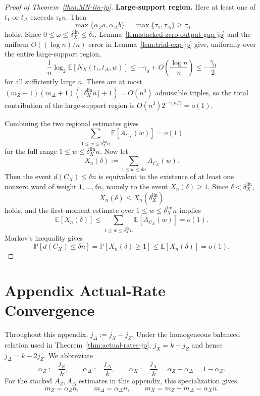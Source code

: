 \documentclass[11pt]{article}
\theoremstyle{definition}
\newcommand{\engappendixsection}[2]{%
  \refstepcounter{section}%
  \section*{Appendix \thesection\quad #1}%
  \label{#2}%
}
\newcommand{\EE}{\mathbb E}
\newcommand{\PP}{\mathbb P}
\newcommand{\CX}{C_X}
\newcommand{\NX}{N_X}
\begin{document}
\begin{proof}[Proof of Theorem~\ref{thm:MN-lin-jp}]
\smallskip
\noindent\textbf{Large-support region.}
Here at least one of \(t_1\) or \(t_\Delta\) exceeds \(\tau_0 n\).
Then
\begin{equation*}
\max\{\alpha_Za,\alpha_\Delta b\}
=\max\{\tau_1,\tau_\Delta\}
\ge \tau_0
\end{equation*}
holds.
Since \(0\le\omega\le\delta_X^{\mathrm{lin}}\le\delta_*\), Lemma~\ref{lem:stacked-zero-output-gap-jp} and the uniform \(O((\log n)/n)\) error in Lemma~\ref{lem:trial-exp-jp} give, uniformly over the entire large-support region,
\begin{equation*}
\frac1n\log_2\EE[\NX(t_1,t_\Delta,w)]
\le -\gamma_0+O\!\left(\frac{\log n}{n}\right)
\le -\frac{\gamma_0}{2}
\end{equation*}
for all sufficiently large \(n\).
There are at most \((m_Z+1)(m_\Delta+1)(\lfloor\delta_X^{\mathrm{lin}}n\rfloor+1)=O(n^3)\) admissible triples, so the total contribution of the large-support region is \(O(n^3)2^{-\gamma_0 n/2}=o(1)\).

Combining the two regional estimates gives
\begin{equation*}
\sum_{1\le w\le \delta_X^{\mathrm{lin}}n}\EE[A_{\CX}(w)] = o(1)
\end{equation*}
for the full range \(1\le w\le \delta_X^{\mathrm{lin}}n\).
Now let
\begin{equation*}
X_n(\delta):=\sum_{1\le w\le \delta n}A_{\CX}(w).
\end{equation*}
Then the event \(d(\CX)\le \delta n\) is equivalent to the existence of at least one nonzero word
of weight \(1,\dots,\delta n\), namely to the event \(X_n(\delta)\ge 1\).
Since \(\delta<\delta_X^{\mathrm{lin}}\),
\begin{equation*}
X_n(\delta)\le X_n(\delta_X^{\mathrm{lin}})
\end{equation*}
holds, and the first-moment estimate over \(1\le w\le\delta_X^{\mathrm{lin}}n\) implies
\begin{equation*}
\EE[X_n(\delta)]\le \sum_{1\le w\le \delta_X^{\mathrm{lin}}n}\EE[A_{\CX}(w)]=o(1).
\end{equation*}
Markov's inequality gives
\begin{equation*}
\PP[d(\CX)\le \delta n]
=
\PP[X_n(\delta)\ge 1]
\le
\EE[X_n(\delta)]
=o(1).
\end{equation*}
\end{proof}


\engappendixsection{Actual-Rate Convergence}{app:actual-rates-jp}

Throughout this appendix, \(j_\Delta:=j_X-j_Z\). Under the homogeneous balanced relation used in Theorem~\ref{thm:actual-rates-jp}, \(j_X=k-j_Z\) and hence \(j_\Delta=k-2j_Z\). We abbreviate
\begin{equation*}
\alpha_Z:=\frac{j_Z}{k},
\qquad
\alpha_\Delta:=\frac{j_\Delta}{k},
\qquad
\alpha_X:=\frac{j_X}{k}=\alpha_Z+\alpha_\Delta=1-\alpha_Z.
\end{equation*}
For the stacked \(A_Z,A_\Delta\) estimates in this appendix, this specialization gives
\[
m_Z=\alpha_Z n,\qquad
m_\Delta=\alpha_\Delta n,\qquad
m_X=m_Z+m_\Delta=\alpha_X n.
\]
 
\end{document}
